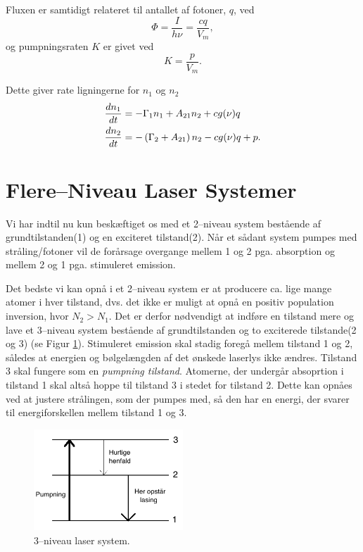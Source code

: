 Fluxen er samtidigt relateret til antallet af fotoner, $q$, ved 
\begin{equation}
\Phi = \frac{I}{h\nu} = \frac{cq}{V_m},
\end{equation}
og pumpningsraten $K$ er givet ved 
\begin{equation}
K = \frac{p}{V_m}.
\end{equation}

Dette giver rate ligningerne for $n_1$ og $n_2$
\begin{align}
{d{n_1} \over d{t}} &= -\Gamma_1n_1 + A_{21}n_2 + cg(\nu)q\\
{d{n_2} \over d{t}} &=-\left( \Gamma_2 + A_{21}\right)n_2 - cg(\nu)q + p.
\end{align}


\section{Flere--Niveau Laser Systemer}
Vi har indtil nu kun beskæftiget os med et 2--niveau system bestående af grundtilstanden(1) og en exciteret tilstand(2). Når et sådant system pumpes med stråling/fotoner vil de forårsage overgange mellem 1 og 2 pga. absorption og mellem 2 og 1 pga. stimuleret emission. 

Det bedste vi kan opnå i et 2--niveau system er at producere ca. lige mange atomer i hver tilstand, dvs. det ikke er muligt at opnå en positiv population inversion, hvor $N_2>N_1$. Det er derfor nødvendigt at indføre en tilstand mere og lave et 3--niveau system bestående af grundtilstanden og to exciterede tilstande(2 og 3) (se Figur \ref{fig:3niveau}). Stimuleret emission skal stadig foregå mellem tilstand 1 og 2, således at energien og bølgelængden af det ønskede laserlys ikke ændres. Tilstand 3 skal fungere som en \emph{pumpning tilstand}. Atomerne, der undergår absoprtion i tilstand 1 skal altså hoppe til tilstand 3 i stedet for tilstand 2. Dette kan opnåes ved at justere strålingen, som der pumpes med, så den har en energi, der svarer til energiforskellen mellem tilstand 1 og 3. 

\begin{figure}[h!]
  \centering
  \includegraphics[width=0.5\textwidth]{Laserfysik/3niveau.png}
  \caption{3--niveau laser system.}
  \label{fig:3niveau}
\end{figure}

